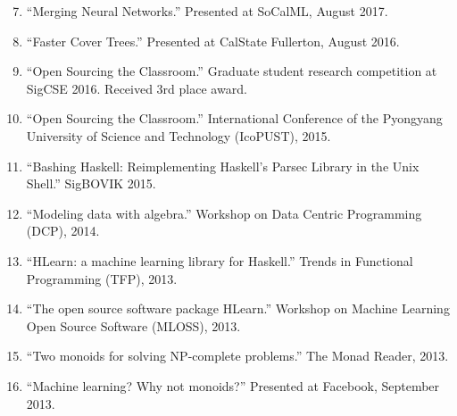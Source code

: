 \documentclass[12pt]{article}
\begin{document}
\begin{enumerate}
\setcounter{enumi}{6}
\item
``Merging Neural Networks.''  Presented at SoCalML, August 2017.

\item
``Faster Cover Trees.''  Presented at CalState Fullerton, August 2016.

\item
``Open Sourcing the Classroom.''  Graduate student research competition at SigCSE 2016.  Received 3rd place award.

\item
``Open Sourcing the Classroom.''  International Conference of the Pyongyang University of Science and Technology (IcoPUST), 2015.

\item
``Bashing Haskell: Reimplementing Haskell's Parsec Library in the Unix Shell.''
SigBOVIK 2015.

\item
``Modeling data with algebra.'' Workshop on Data Centric Programming (DCP), 2014.

\item
``HLearn: a machine learning library for Haskell.''
Trends in Functional Programming (TFP), 2013.

\item
``The open source software package HLearn.''
Workshop on Machine Learning Open Source Software (MLOSS), 2013.

\item
``Two monoids for solving NP-complete problems.''
The Monad Reader, 2013.

\item
``Machine learning? Why not monoids?''
Presented at Facebook, September 2013.
\end{enumerate}

%
%
%


\end{document}

